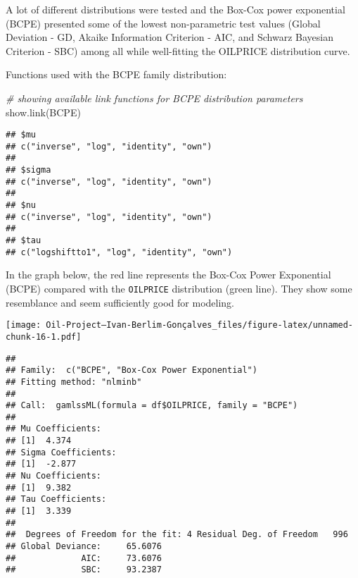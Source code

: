 \documentclass[
]{article}
\newenvironment{Shaded}{\begin{snugshade}}{\end{snugshade}}
\newcommand{\AttributeTok}[1]{\textcolor[rgb]{0.77,0.63,0.00}{#1}}
\newcommand{\CommentTok}[1]{\textcolor[rgb]{0.56,0.35,0.01}{\textit{#1}}}
\newcommand{\ConstantTok}[1]{\textcolor[rgb]{0.00,0.00,0.00}{#1}}
\newcommand{\FunctionTok}[1]{\textcolor[rgb]{0.00,0.00,0.00}{#1}}
\newcommand{\NormalTok}[1]{#1}
\newcommand{\SpecialCharTok}[1]{\textcolor[rgb]{0.00,0.00,0.00}{#1}}
\newcommand{\StringTok}[1]{\textcolor[rgb]{0.31,0.60,0.02}{#1}}
\begin{document}
A lot of different distributions were tested and the Box-Cox power
exponential (BCPE) presented some of the lowest non-parametric test
values (Global Deviation - GD, Akaike Information Criterion - AIC, and
Schwarz Bayesian Criterion - SBC) among all while well-fitting the
OILPRICE distribution curve.

Functions used with the BCPE family distribution:

\begin{Shaded}
\begin{Highlighting}[]
\CommentTok{\# showing available link functions for BCPE distribution parameters}
\FunctionTok{show.link}\NormalTok{(}\StringTok{\textquotesingle{}BCPE\textquotesingle{}}\NormalTok{)}
\end{Highlighting}
\end{Shaded}

\begin{verbatim}
## $mu
## c("inverse", "log", "identity", "own")
## 
## $sigma
## c("inverse", "log", "identity", "own")
## 
## $nu
## c("inverse", "log", "identity", "own")
## 
## $tau
## c("logshiftto1", "log", "identity", "own")
\end{verbatim}

In the graph below, the red line represents the Box-Cox Power
Exponential (BCPE) compared with the \texttt{OILPRICE} distribution
(green line). They show some resemblance and seem sufficiently good for
modeling.

\begin{Shaded}
\end{Shaded}

\texttt{[image: Oil-Project---Ivan-Berlim-Gonçalves\_files/figure-latex/unnamed-chunk-16-1.pdf]}

\begin{verbatim}
## 
## Family:  c("BCPE", "Box-Cox Power Exponential") 
## Fitting method: "nlminb" 
## 
## Call:  gamlssML(formula = df$OILPRICE, family = "BCPE") 
## 
## Mu Coefficients:
## [1]  4.374
## Sigma Coefficients:
## [1]  -2.877
## Nu Coefficients:
## [1]  9.382
## Tau Coefficients:
## [1]  3.339
## 
##  Degrees of Freedom for the fit: 4 Residual Deg. of Freedom   996 
## Global Deviance:     65.6076 
##             AIC:     73.6076 
##             SBC:     93.2387
\end{verbatim}
\end{document}
